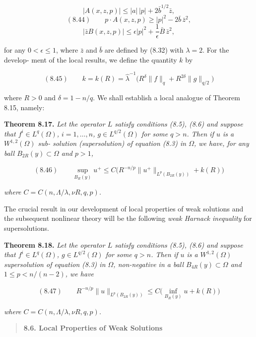 \[
|A(x,z,p)|\leq |a|\,|p|+2\bar b^{1/2}\bar z,
\]
\[
(8.44)\qquad p\cdot A(x,z,p)\geq |p|^2-2\bar b\,\bar z^2,
\]
\[
|\bar z B(x,z,p)|\leq \epsilon|p|^2+\frac{1}{\epsilon}\bar B\,\bar z^2,
\]

for any $0<\epsilon\leq 1$, where $\bar z$ and $\bar b$ are defined by (8.32) with $\lambda=2$. For the develop-
ment of the local results, we define the quantity $k$ by

\[
(8.45)\qquad k=k(R)=\hat\lambda^{-1}\bigl(R^\delta\|f\|_{q}+R^{2\delta}\|g\|_{q/2}\bigr)
\]

where $R>0$ and $\delta=1-n/q$. We shall establish a local analogue of Theorem 8.15,
namely:

\noindent\textbf{Theorem 8.17.} \emph{Let the operator $L$ satisfy conditions (8.5), (8.6) and suppose that
$f^i\in L^q(\Omega)$, $i=1,\ldots,n$, $g\in L^{q/2}(\Omega)$ for some $q>n$. Then if $u$ is a $W^{1,2}(\Omega)$ sub-
solution (supersolution) of equation (8.3) in $\Omega$, we have, for any ball $B_{2R}(y)\subset\Omega$ and
$p>1$,}

\[
(8.46)\qquad \sup_{B_R(y)} u^{+}\leq C\bigl(R^{-n/p}\|u^{+}\|_{L^p(B_{2R}(y))}+k(R)\bigr)
\]

\emph{where $C=C(n,\Lambda/\lambda,\nu R,q,p)$.}

The crucial result in our development of local properties of weak solutions and
the subsequent nonlinear theory will be the following \emph{weak Harnack inequality} for
supersolutions.

\noindent\textbf{Theorem 8.18.} \emph{Let the operator $L$ satisfy conditions (8.5), (8.6) and suppose that
$f^i\in L^q(\Omega)$, $g\in L^{q/2}(\Omega)$ for some $q>n$. Then if $u$ is a $W^{1,2}(\Omega)$ supersolution of
equation (8.3) in $\Omega$, non-negative in a ball $B_{4R}(y)\subset\Omega$ and $1\leq p<n/(n-2)$, we have}

\[
(8.47)\qquad R^{-n/p}\|u\|_{L^p(B_{2R}(y))}\leq C\bigl(\inf_{B_R(y)}u+k(R)\bigr)
\]

\emph{where $C=C(n,\Lambda/\lambda,\nu R,q,p)$.}



\begin{quote}
\textbf{8.6. Local Properties of Weak Solutions}
\end{quote}

